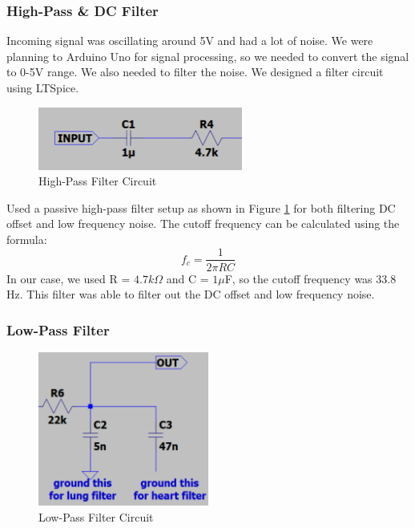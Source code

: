 \subsubsection{High-Pass \& DC Filter}
Incoming signal was oscillating around 5V and had a lot of noise. We were planning to Arduino Uno for signal processing, so we needed to convert the signal to 0-5V range. We also needed to filter the noise. We designed a filter circuit using LTSpice.
\begin{figure}[h]
    \centering
    \includegraphics[width=0.6\textwidth]{assets/high-pass.png}
    \caption{High-Pass Filter Circuit}
    \label{fig:hp_filter_circuit}
\end{figure}

Used a passive high-pass filter setup as shown in Figure \ref{fig:hp_filter_circuit} for both filtering DC offset and low frequency noise. The cutoff frequency can be calculated using the formula:
\begin{equation}\label{eq:filter_cutoff}
    f_c = \frac{1}{2\pi RC}
\end{equation}
In our case, we used R = $4.7k\Omega$ and C = $1\mu$F, so the cutoff frequency was $33.8$Hz. This filter was able to filter out the DC offset and low frequency noise.

\subsubsection{Low-Pass Filter}

\begin{figure}[h]
    \centering
    \includegraphics[width=0.5\textwidth]{assets/low-pass.png}
    \caption{Low-Pass Filter Circuit}
    \label{fig:lp_filter_circuit}
\end{figure}

